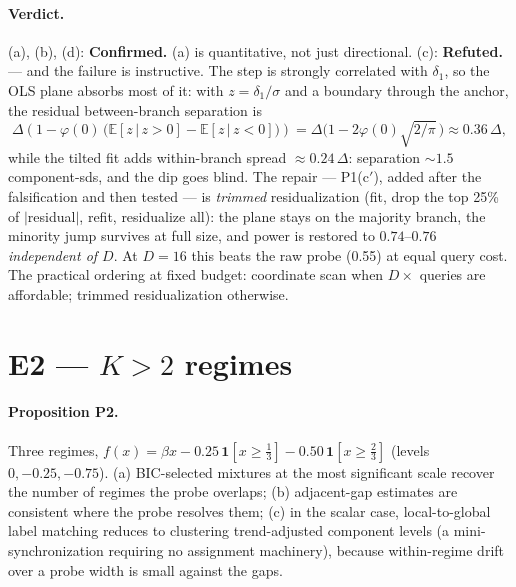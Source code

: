 \documentclass[11pt]{article}
\newcommand{\E}{\mathbb{E}}
\newcommand{\Ind}{\mathbf{1}}
\newcommand{\confirmed}{\textcolor{ok}{\textbf{Confirmed.}}}
\newcommand{\refuted}{\textcolor{bad}{\textbf{Refuted.}}}
\begin{document}
\paragraph{Verdict.} (a), (b), (d): \confirmed{} (a) is quantitative, not just directional.
(c): \refuted{} --- and the failure is instructive. The step is strongly correlated with
$\delta_1$, so the OLS plane absorbs most of it: with $z=\delta_1/\sigma$ and a boundary
through the anchor, the residual between-branch separation is
\[
  \Delta\left(1-\varphi(0)\,\bigl(\E[z\,|\,z{>}0]-\E[z\,|\,z{<}0]\bigr)\right)
  = \Delta\bigl(1-2\varphi(0)\sqrt{2/\pi}\,\bigr)\approx 0.36\,\Delta,
\]
while the tilted fit adds within-branch spread $\approx 0.24\,\Delta$: separation
$\sim 1.5$ component-sds, and the dip goes blind. The repair --- P1(c$'$), added after the
falsification and then tested --- is \emph{trimmed} residualization (fit, drop the top 25\%
of $|$residual$|$, refit, residualize all): the plane stays on the majority branch, the
minority jump survives at full size, and power is restored to $0.74$--$0.76$
\emph{independent of $D$}. At $D{=}16$ this beats the raw probe (0.55) at equal query cost.
The practical ordering at fixed budget: coordinate scan when $D\times$ queries are
affordable; trimmed residualization otherwise.

\section{E2 --- $K>2$ regimes}

\paragraph{Proposition P2.} Three regimes,
$f(x)=\beta x-0.25\,\Ind[x\ge\tfrac13]-0.50\,\Ind[x\ge\tfrac23]$
(levels $0,-0.25,-0.75$). (a) BIC-selected mixtures at the most significant scale recover
the number of regimes the probe overlaps; (b) adjacent-gap estimates are consistent where
the probe resolves them; (c) in the scalar case, local-to-global label matching reduces to
clustering trend-adjusted component levels (a mini-synchronization requiring no assignment
machinery), because within-regime drift over a probe width is small against the gaps.
\end{document}
